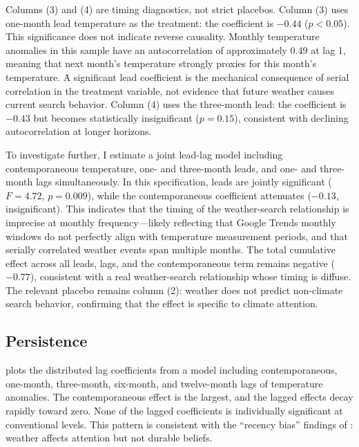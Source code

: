 \documentclass[12pt]{article}
\begin{document}
Columns (3) and (4) are timing diagnostics, not strict placebos. Column (3) uses one-month lead temperature as the treatment: the coefficient is $-0.44$ ($p < 0.05$). This significance does not indicate reverse causality. Monthly temperature anomalies in this sample have an autocorrelation of approximately 0.49 at lag 1, meaning that next month's temperature strongly proxies for this month's temperature. A significant lead coefficient is the mechanical consequence of serial correlation in the treatment variable, not evidence that future weather causes current search behavior. Column (4) uses the three-month lead: the coefficient is $-0.43$ but becomes statistically insignificant ($p = 0.15$), consistent with declining autocorrelation at longer horizons.

To investigate further, I estimate a joint lead-lag model including contemporaneous temperature, one- and three-month leads, and one- and three-month lags simultaneously. In this specification, leads are jointly significant ($F = 4.72$, $p = 0.009$), while the contemporaneous coefficient attenuates ($-0.13$, insignificant). This indicates that the timing of the weather-search relationship is imprecise at monthly frequency---likely reflecting that Google Trends monthly windows do not perfectly align with temperature measurement periods, and that serially correlated weather events span multiple months. The total cumulative effect across all leads, lags, and the contemporaneous term remains negative ($-0.77$), consistent with a real weather-search relationship whose timing is diffuse. The relevant placebo remains column (2): weather does not predict non-climate search behavior, confirming that the effect is specific to climate attention.



\subsection{Persistence}

 plots the distributed lag coefficients from a model including contemporaneous, one-month, three-month, six-month, and twelve-month lags of temperature anomalies. The contemporaneous effect is the largest, and the lagged effects decay rapidly toward zero. None of the lagged coefficients is individually significant at conventional levels. This pattern is consistent with the ``recency bias'' findings of \citet{eganmullin2012}: weather affects attention but not durable beliefs.
\end{document}
